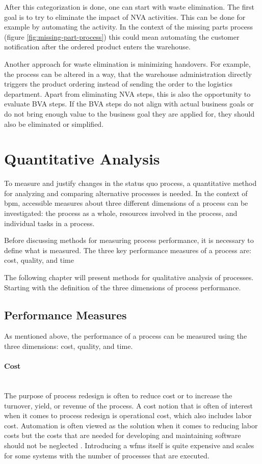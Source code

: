 After this categorization is done, one can start with waste elimination. The first goal is to try to eliminate the impact of NVA activities. This can be done for example by automating the activity. In the context of the missing parts process (figure \ref{fig:missing-part-process}) this could mean automating the customer notification after the ordered product enters the warehouse. 

Another approach for waste elimination is minimizing handovers. For example, the process can be altered in a way, that the warehouse administration directly triggers the product ordering instead of sending the order to the logistics department. Apart from eliminating NVA steps, this is also the opportunity to evaluate BVA steps. If the BVA steps do not align with actual business goals or do not bring enough value to the business goal they are applied for, they should also be eliminated or simplified. \cite{fundamentals}\cite{harrington2016value}


\section{Quantitative Analysis}\label{quant}
To measure and justify changes in the status quo process, a quantitative method for analyzing and comparing alternative processes is needed. In the context of \gls{bpm}, accessible measures about three different dimensions of a process can be investigated: the process as a whole, resources involved in the process, and individual tasks in a process. \cite{fundamentals}

Before discussing methods for measuring process performance, it is necessary to define what is measured. The three key performance measures of a process are: cost, quality, and time\cite{fundamentals}

The following chapter will present methods for qualitative analysis of processes. Starting with the definition of the three dimensions of process performance. 

\subsection{Performance Measures}
As mentioned above, the performance of a process can be measured using the three dimensions:  cost, quality, and time. 
\paragraph{Cost}~\\
The purpose of process redesign is often to reduce cost or to increase the turnover, yield, or revenue of the process. A cost notion that is often of interest when it comes to process redesign is operational cost, which also includes labor cost. Automation is often viewed as the solution when it comes to reducing labor costs but the costs that are needed for developing and maintaining software should not be neglected \cite{fundamentals}. Introducing a \gls{wfms} itself is quite expensive and scales for some systems with the number of processes that are executed.

